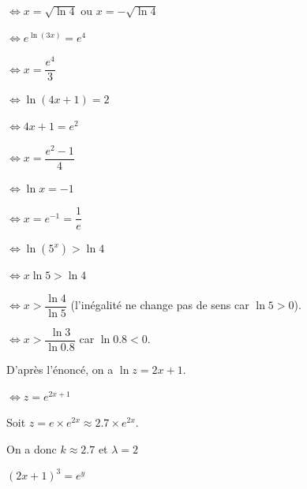 \documentclass[a4paper,12pt]{scrartcl}
\begin{document}
$\Leftrightarrow x = \sqrt{\ln 4}$ ou $x = -\sqrt{\ln 4}$


\exo{}


$\Leftrightarrow e^{\ln(3x)} = e^{4}$

$\Leftrightarrow x = \dfrac{e^{4}}{3} $



$\Leftrightarrow \ln(4x + 1) = 2$

$\Leftrightarrow 4x + 1 = e^2$

$\Leftrightarrow x = \dfrac{e^2 - 1}{4}$



$\Leftrightarrow \ln x = -1$

$\Leftrightarrow x = e^{-1} = \dfrac{1}{e}$




$\Leftrightarrow \ln(5^{x}) > \ln 4$

$\Leftrightarrow x \ln 5 > \ln 4$

$\Leftrightarrow x > \dfrac{\ln 4}{\ln 5}$ (l'inégalité ne change pas de sens car $\ln 5 > 0$).

\Answer{$\mathcal{S} = \left] \dfrac{\ln 4}{\ln 5} ; +\infty \right[$}


$\Leftrightarrow x > \dfrac{\ln 3}{\ln 0.8}$ car $\ln 0.8 < 0$.

\Answer{$\mathcal{S} = \left] \dfrac{\ln 3}{\ln 0.8} ; +\infty \right[$}

\exo{}

D'après l'énoncé, on a $\ln z = 2x+1$. 

$\Leftrightarrow z = e^{2x+1}$

Soit $z = e \times e^{2x} \approx 2.7 \times e^{2x}$.

On a donc $k \approx 2.7$ et $\lambda = 2$

\exo{}

$(2x+1)^{3} = e^{y}$
\end{document}
